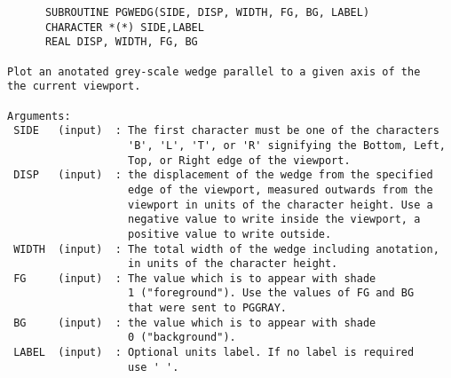 \begin{small}
\begin{verbatim}
      SUBROUTINE PGWEDG(SIDE, DISP, WIDTH, FG, BG, LABEL)
      CHARACTER *(*) SIDE,LABEL
      REAL DISP, WIDTH, FG, BG

Plot an anotated grey-scale wedge parallel to a given axis of the
the current viewport.

Arguments:
 SIDE   (input)  : The first character must be one of the characters
                   'B', 'L', 'T', or 'R' signifying the Bottom, Left,
                   Top, or Right edge of the viewport.
 DISP   (input)  : the displacement of the wedge from the specified
                   edge of the viewport, measured outwards from the
                   viewport in units of the character height. Use a
                   negative value to write inside the viewport, a
                   positive value to write outside.
 WIDTH  (input)  : The total width of the wedge including anotation,
                   in units of the character height.
 FG     (input)  : The value which is to appear with shade
                   1 ("foreground"). Use the values of FG and BG
                   that were sent to PGGRAY.
 BG     (input)  : the value which is to appear with shade
                   0 ("background").
 LABEL  (input)  : Optional units label. If no label is required
                   use ' '.
\end{verbatim}
\end{small}

